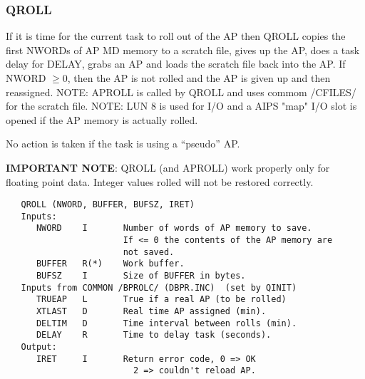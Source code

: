 \subsubsection{QROLL}
If it is time for the current task to roll out of the AP then QROLL
copies the first NWORDs of AP MD memory to a scratch file,
gives up the AP, does a task delay for DELAY, grabs an AP and loads
the scratch file back into the AP.  If NWORD $\ge 0$, then the AP is
not rolled and the AP is given up and then reassigned.
NOTE: APROLL is called by QROLL and uses commom /CFILES/ for the
scratch file.  NOTE: LUN 8 is used for I/O and a AIPS "map" I/O
slot is opened if the AP memory is actually rolled.

No action is taken if the task is using a ``pseudo'' AP.

{\bf IMPORTANT NOTE}:  QROLL (and APROLL) work properly only for floating
point data.  Integer values rolled will not be restored correctly.
\begin{verbatim}
   QROLL (NWORD, BUFFER, BUFSZ, IRET)
   Inputs:
      NWORD    I       Number of words of AP memory to save.
                       If <= 0 the contents of the AP memory are
                       not saved.
      BUFFER   R(*)    Work buffer.
      BUFSZ    I       Size of BUFFER in bytes.
   Inputs from COMMON /BPROLC/ (DBPR.INC)  (set by QINIT)
      TRUEAP   L       True if a real AP (to be rolled)
      XTLAST   D       Real time AP assigned (min).
      DELTIM   D       Time interval between rolls (min).
      DELAY    R       Time to delay task (seconds).
   Output:
      IRET     I       Return error code, 0 => OK
                         2 => couldn't reload AP.

\end{verbatim}


